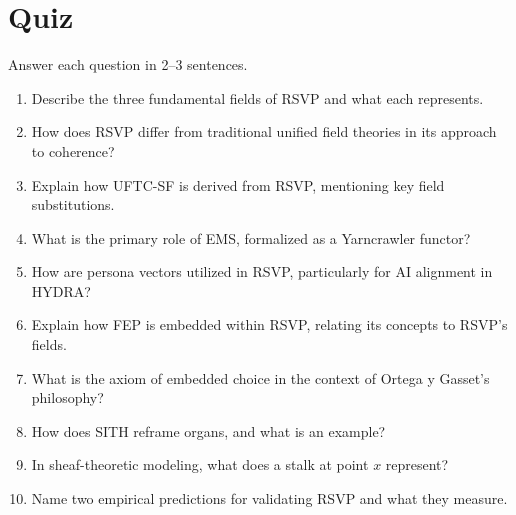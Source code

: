 \documentclass[12pt]{report}
\begin{document}
\chapter{Quiz}
Answer each question in 2–3 sentences.
\begin{enumerate}
    \item Describe the three fundamental fields of RSVP and what each represents.
    \item How does RSVP differ from traditional unified field theories in its approach to coherence?
    \item Explain how UFTC-SF is derived from RSVP, mentioning key field substitutions.
    \item What is the primary role of EMS, formalized as a Yarncrawler functor?
    \item How are persona vectors utilized in RSVP, particularly for AI alignment in HYDRA?
    \item Explain how FEP is embedded within RSVP, relating its concepts to RSVP’s fields.
    \item What is the axiom of embedded choice in the context of Ortega y Gasset’s philosophy?
    \item How does SITH reframe organs, and what is an example?
    \item In sheaf-theoretic modeling, what does a stalk at point \(x\) represent?
    \item Name two empirical predictions for validating RSVP and what they measure.
\end{enumerate}
\end{document}
